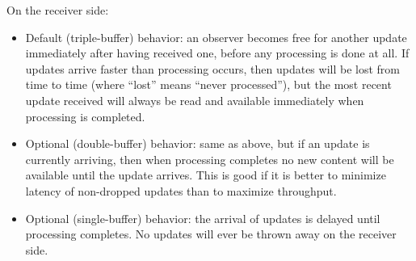 On the receiver side:

\begin{itemize}

\item Default (triple-buffer) behavior: an observer becomes free for
another update immediately after having received one, before any
processing is done at all.  If updates arrive faster than processing
occurs, then updates will be lost from time to time (where ``lost''
means ``never processed''), but the most recent update received will
always be read and available immediately when processing is completed.

\item Optional (double-buffer) behavior: same as above, but if an
update is currently arriving, then when processing completes no new
content will be available until the update arrives.  This is good if
it is better to minimize latency of non-dropped updates than to
maximize throughput.

\item Optional (single-buffer) behavior: the arrival of updates
is delayed until processing completes.  No updates will ever be 
thrown away on the receiver side.


\end{itemize}
